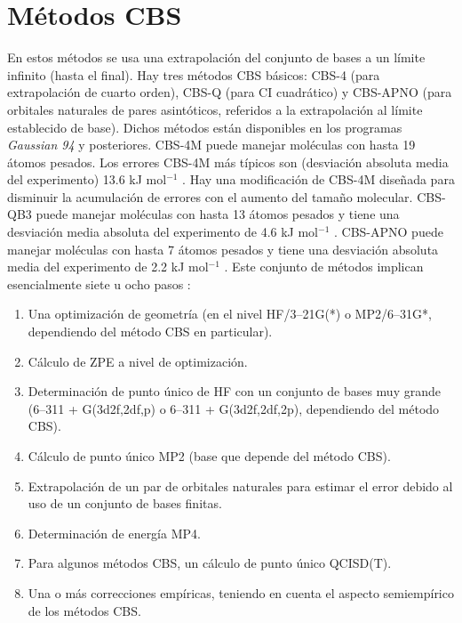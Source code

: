 \section{Métodos CBS}
En estos métodos se usa una extrapolación del conjunto de bases a un límite infinito (hasta el final). Hay tres métodos CBS básicos: CBS-4 (para extrapolación de cuarto orden), CBS-Q (para CI cuadrático) y CBS-APNO (para orbitales naturales de pares asintóticos, referidos a la extrapolación al límite establecido de base). Dichos métodos están disponibles en los programas \textit{Gaussian 94} y posteriores. CBS-4M puede manejar moléculas con hasta 19 átomos pesados. Los errores CBS-4M más típicos son (desviación absoluta media del experimento) 13.6 kJ mol$^{-1}$ \cite{Montgomery2000}. Hay una modificación de CBS-4M diseñada para disminuir la acumulación de errores con el aumento del tamaño molecular. CBS-QB3 puede manejar moléculas con hasta 13 átomos pesados y tiene una desviación media absoluta del experimento de 4.6 kJ mol$^{-1}$ \cite{Montgomery1999}. CBS-APNO puede manejar moléculas con hasta 7 átomos pesados y tiene una desviación absoluta media del experimento de 2.2 kJ mol$^{-1}$ \cite{Irikura1998}. Este conjunto de métodos implican esencialmente siete u ocho pasos \cite{Lewars2016}:

\begin{enumerate}
\item Una optimización de geometría (en el nivel HF/3–21G(*) o MP2/6–31G*, dependiendo del método CBS en particular).

\item Cálculo de ZPE a nivel de optimización.

\item Determinación de punto único de HF con un conjunto de bases muy grande (6–311 + G(3d2f,2df,p) o 6–311 + G(3d2f,2df,2p), dependiendo del método CBS).

\item Cálculo de punto único MP2 (base que depende del método CBS).

\item Extrapolación de un par de orbitales naturales para estimar el error debido al uso de un conjunto de bases finitas.

\item Determinación de energía MP4.

\item Para algunos métodos CBS, un cálculo de punto único QCISD(T).

\item Una o más correcciones empíricas, teniendo en cuenta el aspecto semiempírico de los métodos CBS. 

\end{enumerate}


